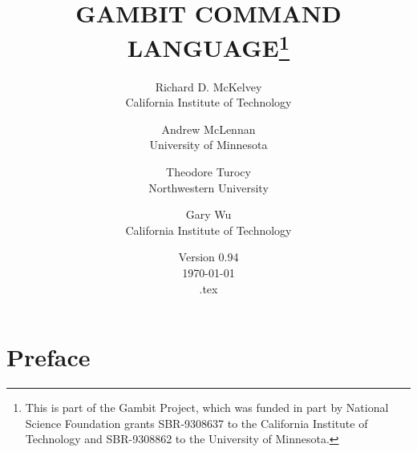 %
%
%


\renewcommand{\baselinestretch}{.9}
\newcommand{\bd}{\begin{description}}
\newcommand{\ed}{\end{description}}

\newcommand{\tindex}[1]{{\tt #1}\index{{\tt #1}}}
\newcommand{\bindex}[1]{{\bf #1}\index{#1}}
\newcommand{\rindex}[1]{{#1}\index{#1}}
\makeindex


\newcommand{\lex}[1]{\mark{#1}\index{{\tt #1}}}

\makeatletter
\def\ps@lexicon{\def\@oddhead{\slshape\mysectionname\hfil 
{\Large\verb+\botmark+}\quad\thepage}
\def\@evenhead{\thepage\quad{\Large\verb+\firstmark+}\hfil \slshape\mysectionname}}
\makeatother

\newcommand{\mysectionname}{\thesection\,\, BUILT-IN FUNCTIONS}






\title{GAMBIT COMMAND LANGUAGE\thanks{This is part of the Gambit
Project, which was funded in part by National Science Foundation
grants SBR-9308637 to the California Institute of Technology and
SBR-9308862 to the University of Minnesota.}}

\author{Richard D. McKelvey\\California Institute of
Technology
\and
Andrew McLennan\\University of
Minnesota
\and 
Theodore Turocy\\Northwestern University
\and
Gary Wu\\California Institute of Technology
}

\date{Version 0.94\\ \today\\ \jobname.tex}

\maketitle

\tableofcontents

\chapter*{Preface}
\pagestyle{myheadings}

